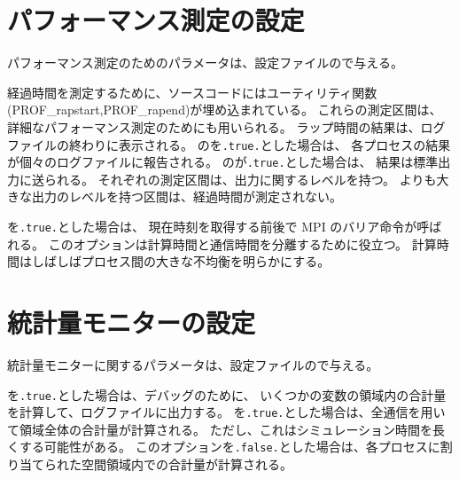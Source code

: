 \section{パフォーマンス測定の設定} \label{subsec:prof}

パフォーマンス測定のためのパラメータは、設定ファイルので与える。


\noindent
経過時間を測定するために、ソースコードにはユーティリティ関数(PROF\_rapstart,PROF\_rapend)が埋め込まれている。
これらの測定区間は、詳細なパフォーマンス測定のためにも用いられる。
%
ラップ時間の結果は、ログファイルの終わりに表示される。
のを\verb|.true.|とした場合は、
各プロセスの結果が個々のログファイルに報告される。
のが\verb|.true.|とした場合は、
結果は標準出力に送られる。
%
それぞれの測定区間は、出力に関するレベルを持つ。
よりも大きな出力のレベルを持つ区間は、経過時間が測定されない。

を\verb|.true.|とした場合は、
現在時刻を取得する前後で MPI のバリア命令が呼ばれる。
このオプションは計算時間と通信時間を分離するために役立つ。
計算時間はしばしばプロセス間の大きな不均衡を明らかにする。


\section{統計量モニターの設定} \label{subsec:statistics}

統計量モニターに関するパラメータは、設定ファイルので与える。


\noindent
{}を\verb|.true.|とした場合は、デバッグのために、
いくつかの変数の領域内の合計量を計算して、ログファイルに出力する。
%
を\verb|.true.|とした場合は、全通信を用いて領域全体の合計量が計算される。
ただし、これはシミュレーション時間を長くする可能性がある。
このオプションを\verb|.false.|とした場合は、各プロセスに割り当てられた空間領域内での合計量が計算される。
